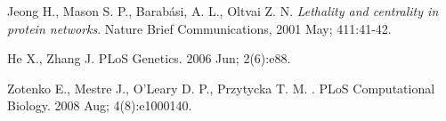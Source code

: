 \documentclass[%
 reprint,
 amsmath,amssymb,
 aps,
]{revtex4-1}
\begin{document}
\begin{thebibliography}{10}

Jeong H., Mason S. P., Barabási, A. L., Oltvai Z. N. {\em Lethality and centrality in protein networks}. Nature Brief Communications, 2001 May; 411:41-42.

He X., Zhang J.
 PLoS Genetics. 2006 Jun; 2(6):e88.

Zotenko E., Mestre J., O'Leary D. P., Przytycka T. M.
.
\newblock PLoS Computational Biology. 2008 Aug; 4(8):e1000140.

\end{thebibliography}
\end{document}
